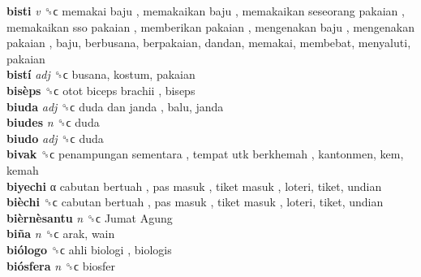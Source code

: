 \textbf{bisti} \emph{v}  ␝ϲ   memakai baju ,  memakaikan baju ,  memakaikan seseorang pakaian ,  memakaikan sso pakaian ,  memberikan pakaian ,  mengenakan baju ,  mengenakan pakaian , baju, berbusana, berpakaian, dandan, memakai, membebat, menyaluti, pakaian  \\
\textbf{bistí} \emph{adj}  ␝ϲ  busana, kostum, pakaian  \\
\textbf{bisèps} ␝ϲ   otot biceps brachii , biseps  \\
\textbf{biuda} \emph{adj}  ␝ϲ   duda dan janda , balu, janda  \\
\textbf{biudes} \emph{n}  ␝ϲ  duda  \\
\textbf{biudo} \emph{adj}  ␝ϲ  duda  \\
\textbf{bivak} ␝ϲ   penampungan sementara ,  tempat utk berkhemah , kantonmen, kem, kemah  \\
\textbf{biyechi} α   cabutan bertuah ,  pas masuk ,  tiket masuk , loteri, tiket, undian  \\
\textbf{bièchi} ␝ϲ   cabutan bertuah ,  pas masuk ,  tiket masuk , loteri, tiket, undian  \\
\textbf{bièrnèsantu} \emph{n}  ␝ϲ   Jumat Agung   \\
\textbf{biña} \emph{n}  ␝ϲ  arak, wain  \\
\textbf{biólogo} ␝ϲ   ahli biologi , biologis  \\
\textbf{biósfera} \emph{n}  ␝ϲ  biosfer  \\
